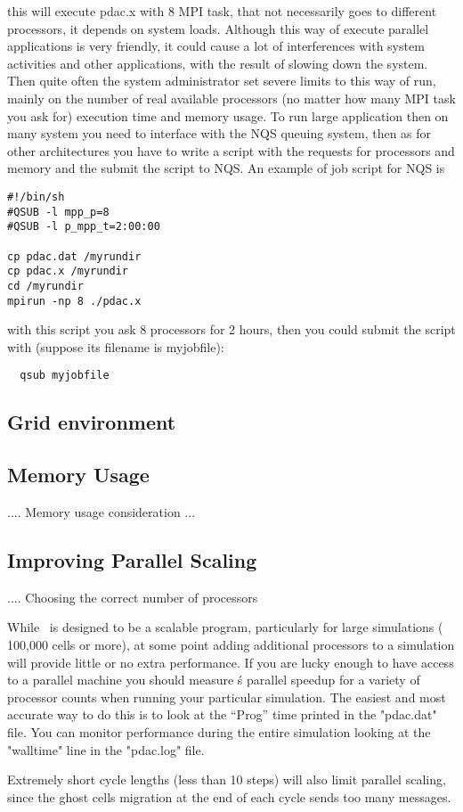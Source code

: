 this will execute pdac.x with 8 MPI task, that not necessarily
goes to different processors, it depends on system loads.
Although this way of execute parallel applications is very
friendly, it could cause a lot of interferences with system
activities and other applications, with the result of slowing
down the system. Then quite often the system administrator
set severe limits to this way of run, mainly on the number of
real available processors (no matter how many MPI task you ask for) 
execution time and memory usage.
To run large application then on many system you need to 
interface with the NQS queuing system, then as for other architectures
you have to write a script with the requests for processors and
memory and the submit the script to NQS.
An example of job script for NQS is 

\begin{verbatim}
#!/bin/sh
#QSUB -l mpp_p=8
#QSUB -l p_mpp_t=2:00:00

cp pdac.dat /myrundir
cp pdac.x /myrundir
cd /myrundir
mpirun -np 8 ./pdac.x
\end{verbatim}

with this script you ask 8 processors for 2 hours, then
you could submit the script with 
(suppose its filename is myjobfile):

\begin{verbatim}
  qsub myjobfile
\end{verbatim}

\subsection{Grid environment}

\subsection{Memory Usage}

.... Memory usage consideration ...

\subsection{Improving Parallel Scaling}

.... Choosing the correct number of processors

While \PDAC\ is designed to be a scalable program, particularly for
large simulations ( 100,000 cells or more), at some point adding additional
processors to a simulation will provide little or no extra performance.
If you are lucky enough to have access to a parallel machine you should
measure \PDAC\'s parallel speedup for a variety of processor counts when
running your particular simulation.  The easiest and most accurate way
to do this is to look at the ``Prog'' time printed in the "pdac.dat" file.
You can monitor performance during the entire simulation looking at
the "walltime" line in the "pdac.log" file.

Extremely short cycle lengths (less than 10 steps) will also limit
parallel scaling, since the ghost cells migration at the end of each cycle
sends too many messages.
